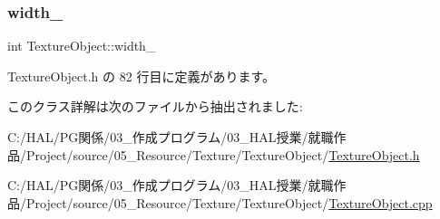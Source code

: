 \subsubsection{\texorpdfstring{width\+\_\+}{width\_}}
{\footnotesize\ttfamily int Texture\+Object\+::width\+\_\+\hspace{0.3cm}{\ttfamily [private]}}



 Texture\+Object.\+h の 82 行目に定義があります。



このクラス詳解は次のファイルから抽出されました\+:\begin{DoxyCompactItemize}
\item 
C\+:/\+H\+A\+L/\+P\+G関係/03\+\_\+作成プログラム/03\+\_\+\+H\+A\+L授業/就職作品/\+Project/source/05\+\_\+\+Resource/\+Texture/\+Texture\+Object/\mbox{\hyperlink{_texture_object_8h}{Texture\+Object.\+h}}\item 
C\+:/\+H\+A\+L/\+P\+G関係/03\+\_\+作成プログラム/03\+\_\+\+H\+A\+L授業/就職作品/\+Project/source/05\+\_\+\+Resource/\+Texture/\+Texture\+Object/\mbox{\hyperlink{_texture_object_8cpp}{Texture\+Object.\+cpp}}\end{DoxyCompactItemize}
